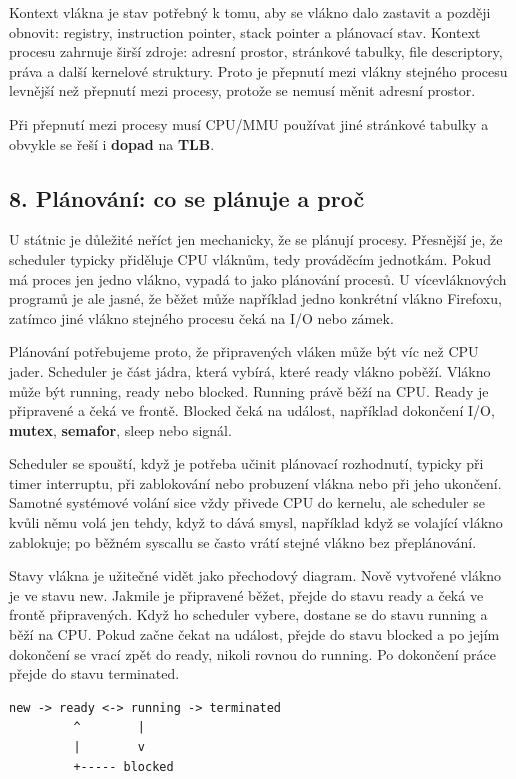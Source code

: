 \documentclass[11pt,a4paper]{article}
\begin{document}
Kontext vlákna je stav potřebný k tomu, aby se vlákno dalo zastavit a později obnovit: registry, instruction pointer, stack pointer a plánovací stav. Kontext procesu zahrnuje širší zdroje: adresní prostor, stránkové tabulky, file descriptory, práva a další kernelové struktury. Proto je přepnutí mezi vlákny stejného procesu levnější než přepnutí mezi procesy, protože se nemusí měnit adresní prostor.

Při přepnutí mezi procesy musí CPU/MMU používat jiné stránkové tabulky a obvykle se řeší i \textbf{dopad} na \textbf{TLB}.

\subsection*{8. Plánování: co se plánuje a proč}

U státnic je důležité neříct jen mechanicky, že se plánují procesy. Přesnější je, že scheduler typicky přiděluje CPU vláknům, tedy prováděcím jednotkám. Pokud má proces jen jedno vlákno, vypadá to jako plánování procesů. U vícevláknových programů je ale jasné, že běžet může například jedno konkrétní vlákno Firefoxu, zatímco jiné vlákno stejného procesu čeká na I/O nebo zámek.

Plánování potřebujeme proto, že připravených vláken může být víc než CPU jader. Scheduler je část jádra, která vybírá, které ready vlákno poběží. Vlákno může být running, ready nebo blocked. Running právě běží na CPU. Ready je připravené a čeká ve frontě. Blocked čeká na událost, například dokončení I/O, \textbf{mutex}, \textbf{semafor}, sleep nebo signál.

Scheduler se spouští, když je potřeba učinit plánovací rozhodnutí, typicky při timer interruptu, při zablokování nebo probuzení vlákna nebo při jeho ukončení. Samotné systémové volání sice vždy přivede CPU do kernelu, ale scheduler se kvůli němu volá jen tehdy, když to dává smysl, například když se volající vlákno zablokuje; po běžném syscallu se často vrátí stejné vlákno bez přeplánování.

Stavy vlákna je užitečné vidět jako přechodový diagram. Nově vytvořené vlákno je ve stavu new. Jakmile je připravené běžet, přejde do stavu ready a čeká ve frontě připravených. Když ho scheduler vybere, dostane se do stavu running a běží na CPU. Pokud začne čekat na událost, přejde do stavu blocked a po jejím dokončení se vrací zpět do ready, nikoli rovnou do running. Po dokončení práce přejde do stavu terminated.

\begin{codebox}
\small
\begin{verbatim}
new -> ready <-> running -> terminated
         ^        |
         |        v
         +----- blocked
\end{verbatim}
\end{codebox}
\end{document}
